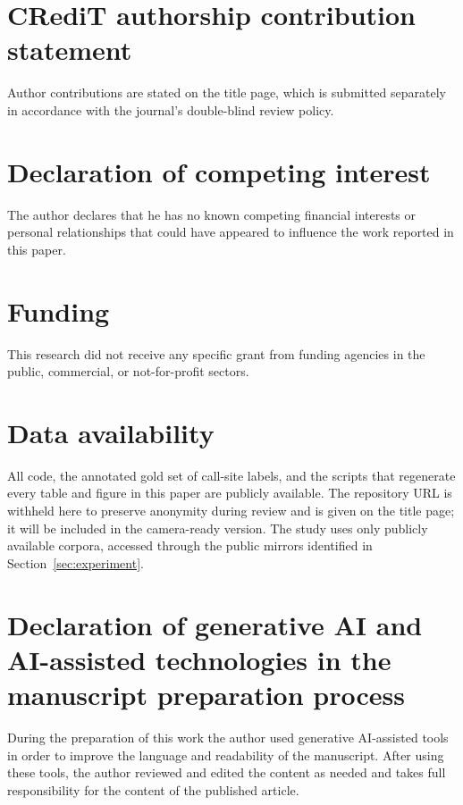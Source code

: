 
\section*{CRediT authorship contribution statement}
Author contributions are stated on the title page, which is submitted
separately in accordance with the journal's double-blind review policy.

\section*{Declaration of competing interest}
The author declares that he has no known competing financial interests or
personal relationships that could have appeared to influence the work reported
in this paper.

\section*{Funding}
This research did not receive any specific grant from funding agencies in the
public, commercial, or not-for-profit sectors.

\section*{Data availability}
All code, the annotated gold set of call-site labels, and the scripts that
regenerate every table and figure in this paper are publicly available. The
repository URL is withheld here to preserve anonymity during review and is
given on the title page; it will be included in the camera-ready version. The
study uses only publicly available corpora, accessed through the public mirrors
identified in Section~\ref{sec:experiment}.

\section*{Declaration of generative AI and AI-assisted technologies in the manuscript preparation process}
During the preparation of this work the author used generative AI-assisted
tools in order to improve the language and readability of the manuscript. After
using these tools, the author reviewed and edited the content as needed and
takes full responsibility for the content of the published article.
